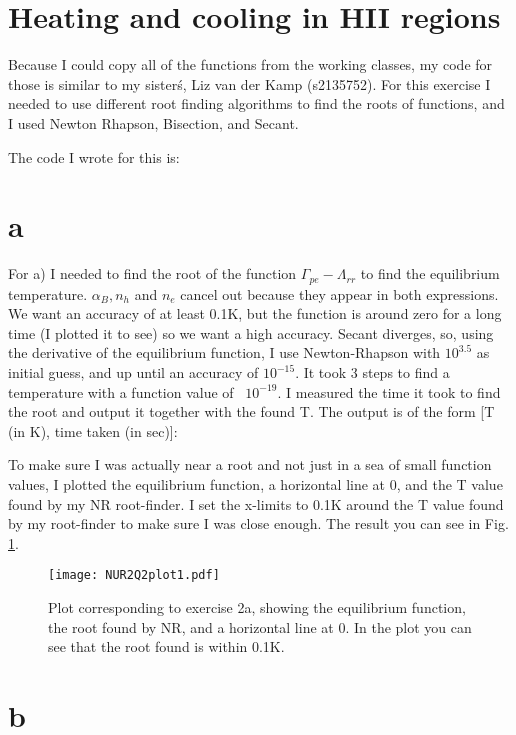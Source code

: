\section{Heating and cooling in HII regions}

Because I could copy all of the functions from the working classes, 
my code for those is similar to my sister\'s, Liz van der Kamp (s2135752). 
For this exercise I needed to use different root finding algorithms to find the roots of functions, and I 
used Newton Rhapson, Bisection, and Secant.

The code I wrote for this is:


\section{a}

For a) I needed to find the root of the function $\Gamma_{pe} - \Lambda_{rr}$ to find the equilibrium 
temperature. $\alpha_B, n_h$ and $n_e$ cancel out because they appear in both expressions.
We want an accuracy of at least 0.1K, but the function is around zero for a long time (I plotted it to see) 
so we want a high accuracy.
Secant diverges, so, using the derivative of the equilibrium function, I use Newton-Rhapson with $10^{3.5}$ as initial guess, and up until an accuracy of $10^{-15}$. It took 3 steps to find a temperature with a function value of ~$10^{-19}$. I measured the time it took to find the root and output it together with the found T. The output is of the form [T (in K), time taken (in sec)]:


To make sure I was actually near a root and not just in a sea of small function values, I plotted the 
equilibrium function, a horizontal line at 0, and the T value found by my NR root-finder. I set the 
x-limits to 0.1K around the T value found by my root-finder to make sure I was close enough.
The result you can see in Fig. \ref{fig:fig1}.

\begin{figure}[h!]
  \centering
  \texttt{[image: NUR2Q2plot1.pdf]}
  \caption{Plot corresponding to exercise 2a, showing the equilibrium function, the root found by NR, and
  a horizontal line at 0. In the plot you can see that the root found is within 0.1K.}
  \label{fig:fig1}
\end{figure} 


\section{b}

